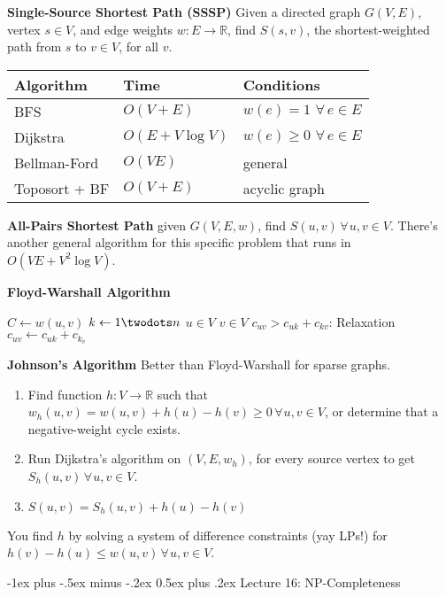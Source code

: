 \documentclass[10pt,landscape]{article}
\makeatletter
\renewcommand{\section}{\@startsection{section}{1}{0mm}%
                                {-1ex plus -.5ex minus -.2ex}%
                                {0.5ex plus .2ex}%
                                {\normalfont\large\bfseries}}
\let\oldforall\forall
\renewcommand{\forall}{\hspace{2pt} \oldforall \hspace{1pt}}
\newcommand{\definition}[1]{\textbf{#1}\hspace{2pt}}
\makeatother
\begin{document}
\begin{multicols}{3}
\definition{Single-Source Shortest Path (SSSP)} Given a directed graph $G(V,E)$, vertex $s \in V$, and edge weights $w: E \to \mathds{R}$, find $S(s,v)$, the shortest-weighted path from $s$ to $v \in V$, for all $v$.

\begin{tabular}{lll}
Algorithm & Time & Conditions \\ \hline
BFS & $O(V + E)$ & $w(e) = 1 \forall e \in E$ \\
Dijkstra & $O(E + V \log V)$ & $w(e) \geq 0 \forall e \in E$ \\
Bellman-Ford & $O(VE)$ & general \\
Toposort + BF & $O(V + E)$ & acyclic graph
\end{tabular}

\definition{All-Pairs Shortest Path} given $G(V,E, w)$, find $S(u,v) \forall u,v \in V$. There's another general algorithm for this specific problem that runs in $O(VE + V^2 \log V)$.

\definition{Floyd-Warshall Algorithm}

\begin{codebox}
\li $C \gets w(u, v)$
\li \For $k \gets 1 \twodots n$
\li \>\For $u \in V$
\li \>\>\For $v \in V$
\li \>\>\>\If $c_{uv} > c_{uk} + c_{kv}$: \Comment Relaxation
\li \>\>\>\> $c_{uv} \gets c_{uk} + c_{k_v}$
\end{codebox}

\definition{Johnson's Algorithm} Better than Floyd-Warshall for sparse graphs.

\begin{enumerate}
\item Find function $h: V \to \mathds{R}$ such that $w_h (u, v) = w(u,v) + h(u) - h(v) \geq 0 \forall u,v \in V$, or determine that a negative-weight cycle exists.
\item Run Dijkstra's algorithm on $(V, E, w_h)$, for every source vertex to get $S_h(u, v) \forall u,v \in V$.
\item $S(u,v) = S_h(u,v) + h(u) - h(v)$
\end{enumerate}

You find $h$ by solving a system of difference constraints (yay LPs!) for$h(v) - h(u) \leq w(u,v) \forall u,v \in V$.


\section{Lecture 16: NP-Completeness}


\end{multicols}
\end{document}
